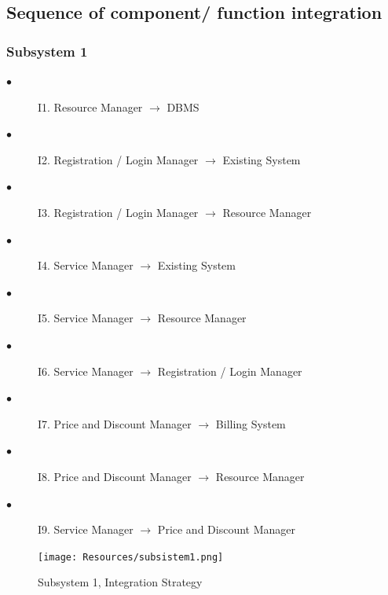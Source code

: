 \documentclass[a4paper,10pt]{article}
\begin{document}
\subsection{Sequence of component/ function integration}
\subsubsection{Subsystem 1}
\begin{description}
    \item[$\bullet$] I1. Resource Manager $\rightarrow$ DBMS
    \item[$\bullet$] I2. Registration / Login Manager $\rightarrow$ Existing System
    \item[$\bullet$] I3. Registration / Login Manager $\rightarrow$ Resource Manager
    \item[$\bullet$] I4. Service Manager $\rightarrow$ Existing System
    \item[$\bullet$] I5. Service Manager $\rightarrow$ Resource Manager
    \item[$\bullet$] I6. Service Manager $\rightarrow$ Registration / Login Manager
    \item[$\bullet$] I7. Price and Discount Manager $\rightarrow$ Billing System
    \item[$\bullet$] I8. Price and Discount Manager $\rightarrow$ Resource Manager
    \item[$\bullet$] I9. Service Manager $\rightarrow$ Price and Discount Manager
  \end{description}
  \begin{figure}[!h]
  \centering
    \texttt{[image: Resources/subsistem1.png]}
    \caption{Subsystem 1, Integration Strategy}
  \end{figure}
  \FloatBarrier
\end{document}
